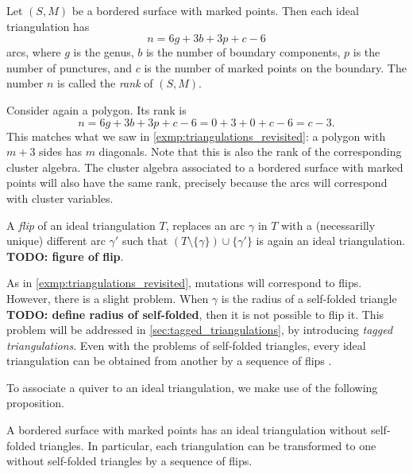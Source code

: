\begin{proposition}

	Let $(S, M)$ be a bordered surface with marked points. Then each ideal triangulation
	has
	\begin{equation*}
		n = 6g + 3b + 3p + c -6
	\end{equation*}
	arcs, where $g$ is the genus, $b$ is the number of boundary components, $p$ is the number of punctures, and $c$ is the number of marked points on the boundary. The number $n$ is called the \emph{rank} of $(S, M)$.
\end{proposition}

Consider again a polygon. Its rank is
\begin{equation*}
	n = 6g + 3b + 3p + c - 6 = 0 + 3 + 0 + c - 6 = c - 3.
\end{equation*}
%
This matches what we saw in \cref{exmp:triangulations_revisited}: a polygon with $m +
	3$ sides has $m$ diagonals. Note that this is also the rank of the corresponding
cluster algebra. The cluster algebra associated to a bordered surface with marked
points will also have the same rank, precisely because the arcs will correspond with
cluster variables.

\begin{definition}

	A \emph{flip} of an ideal triangulation $T$, replaces an arc
	$\gamma$ in $T$ with a (necessarilly unique) different arc $\gamma'$ such that $(T
		\setminus \{\gamma\}) \cup \{\gamma'\}$ is again an ideal triangulation. \textbf{TODO:
		figure of flip}.
\end{definition}

As in \cref{exmp:triangulations_revisited}, mutations will correspond to flips.
However, there is a slight problem. When $\gamma$ is the radius of a self-folded
triangle \textbf{TODO: define radius of self-folded}, then it is not possible to flip
it. This problem will be addressed in \cref{sec:tagged_triangulations}, by introducing
\emph{tagged triangulations}. Even with the problems of self-folded triangles, every
ideal triangulation can be obtained from another by a sequence of flips \parencite[Proposition 3.8]{FominShapiroThurston2008CATriangulatedSurfacesI}.

To associate a quiver to an ideal triangulation, we make use of the following
proposition.

\begin{proposition}

	A bordered surface with marked points has an ideal triangulation without self-folded
	triangles. In particular, each triangulation can be transformed to one without
	self-folded triangles by a sequence of flips.
\end{proposition}

